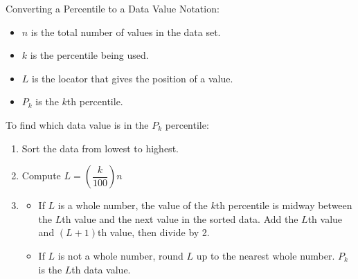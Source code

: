\documentclass{beamer}
\begin{document}
\begin{frame}
\begin{block}{Converting a Percentile to a Data Value}
Notation:
\begin{itemize}
\item $n$ is the total number of values in the data set.
\item $k$ is the percentile being used.
\item $L$ is the locator that gives the position of a value.
\item $P_k$ is the $k$th percentile.
\end{itemize}\pause
To find which data value is in the $P_k$ percentile:
\begin{enumerate}
\item Sort the data from lowest to highest.\pause
\item Compute $L=\left(\dfrac{k}{100}\right)n$\pause
\item \begin{itemize}
\item If $L$ is a whole number, the value of the $k$th percentile is midway between the $L$th value and the next value in the sorted data. Add the $L$th value and $(L+1)$th value, then divide by 2.\pause
\item If $L$ is not a whole number, round $L$ up to the nearest whole number. $P_k$is the $L$th data value. 
\end{itemize}
\end{enumerate}
\end{block}
\end{frame}
\end{document}

